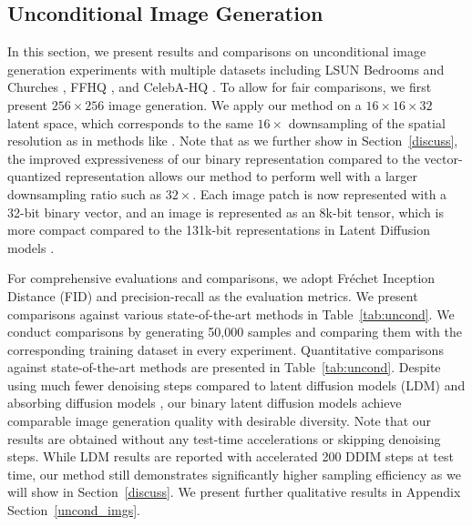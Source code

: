 \documentclass[10pt,twocolumn,letterpaper]{article}
\begin{document}
\subsection{Unconditional Image Generation}
\label{exp_uncond}
In this section, we present results and comparisons on unconditional image generation experiments with multiple datasets including LSUN Bedrooms and Churches \cite{lsun}, FFHQ \cite{stylegan}, and CelebA-HQ \cite{pggan}. 
To allow for fair comparisons, we first present $256\times256$ image generation. We apply our method on a $16\times16\times32$ latent space, which corresponds to the same $16\times$ downsampling of the spatial resolution as in methods like \cite{unleashing,maskgit}. Note that as we further show in Section~\ref{discuss}, the improved expressiveness of our binary representation compared to the vector-quantized representation allows our method to perform well with a larger downsampling ratio such as $32\times$.
Each image patch is now represented with a 32-bit binary vector, and an image is represented as an 8k-bit tensor, which is more compact compared to the 131k-bit representations in Latent Diffusion models \cite{latent}.

For comprehensive evaluations and comparisons, we adopt Fr\'echet Inception Distance (FID) and precision-recall \cite{pr} as the evaluation metrics.
We present comparisons against various state-of-the-art methods in Table~\ref{tab:uncond}.
We conduct comparisons by generating 50,000 samples and comparing them with the corresponding training dataset in every experiment. Quantitative comparisons against state-of-the-art methods are presented in Table~\ref{tab:uncond}. Despite using much fewer denoising steps compared to latent diffusion models (LDM) \cite{latent} and absorbing diffusion models \cite{unleashing}, our binary latent diffusion models achieve comparable image generation quality with desirable diversity.
Note that our results are obtained without any test-time accelerations or skipping denoising steps. While LDM \cite{latent} results are reported with accelerated 200 DDIM \cite{ddim} steps at test time, our method still demonstrates significantly higher sampling efficiency as we will show in Section~\ref{discuss}.
We present further qualitative results in Appendix Section~\ref{uncond_imgs}.
\end{document}
